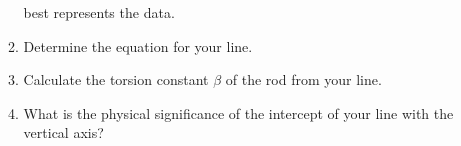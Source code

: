 \documentclass{../../../oss-apphys}
\begin{document}
\begin{enumerate}[leftmargin=15pt]
\begin{enumerate}[leftmargin=15pt,resume]
    best represents the data.
    \begin{center}
    \end{center}
  \item Determine the equation for your line.
  \item Calculate the torsion constant $\beta$ of the rod from your line.
  \item What is the physical significance of the intercept of your line with
    the vertical axis?
  \end{enumerate}
\end{enumerate}
\end{document}
